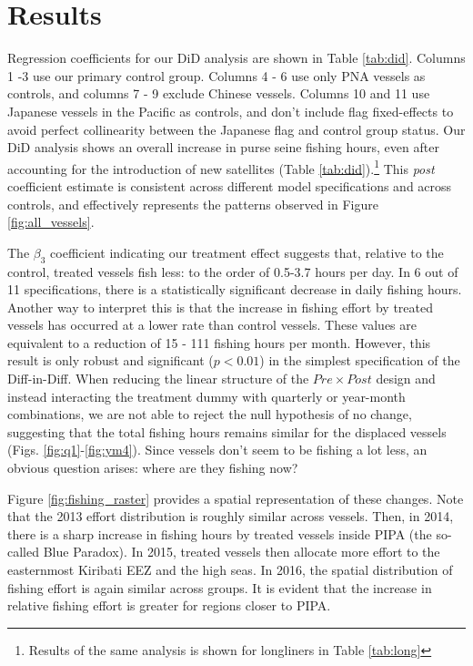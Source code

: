 \documentclass[11pt,english]{article}
\begin{document}
\section{Results}\label{results}

Regression coefficients for our DiD analysis are shown in Table
\ref{tab:did}. Columns 1 -3 use our primary control group. Columns 4 - 6 use
only PNA vessels as controls, and columns 7 - 9 exclude Chinese vessels.
Columns 10 and 11 use Japanese vessels in the Pacific as controls, and
don't include flag fixed-effects to avoid perfect collinearity
between the Japanese flag and
control group status.
Our DiD analysis shows an overall increase in purse seine fishing hours,
even after accounting for the introduction of new satellites (Table
\ref{tab:did}).\footnote{Results of the same analysis is shown for longliners in Table \ref{tab:long}} This 
\emph{post} coefficient estimate is consistent across different
model specifications and across controls, and
effectively represents the patterns observed in Figure
\ref{fig:all_vessels}.

The \(\beta_3\) coefficient indicating our treatment effect suggests
that, relative to the control, treated vessels fish less: to the order
of 0.5-3.7 hours per day. In 6 out of 11 specifications, there is a statistically significant decrease in daily fishing hours. Another way to interpret this is that the increase
in fishing effort by treated vessels has occurred at a lower rate than
control vessels. These values are equivalent to a reduction of 15 - 111 fishing hours per month. However, this result is only robust and
significant (\(p < 0.01\)) in the simplest specification of the
Diff-in-Diff. When reducing the linear structure of the
\(Pre \times Post\) design and instead interacting the treatment dummy
with quarterly or year-month combinations, we are not able to reject the
null hypothesis of no change, suggesting that the total fishing hours
remains similar for the displaced vessels (Figs.
\ref{fig:q1}-\ref{fig:ym4}). Since vessels don't seem to be fishing a lot less, an obvious question arises: where are they
fishing now?

Figure \ref{fig:fishing_raster} provides a spatial representation of
these changes. Note that the 2013 effort distribution is roughly similar
across vessels. Then, in 2014, there is a sharp increase in fishing hours
by treated vessels inside PIPA (the so-called Blue Paradox). In 2015, treated vessels
then allocate more effort to the easternmost Kiribati EEZ and the high seas. In 2016, the spatial distribution of
fishing effort is again similar across groups. It is evident that the
increase in relative fishing effort is greater for regions closer to
PIPA.
\end{document}
